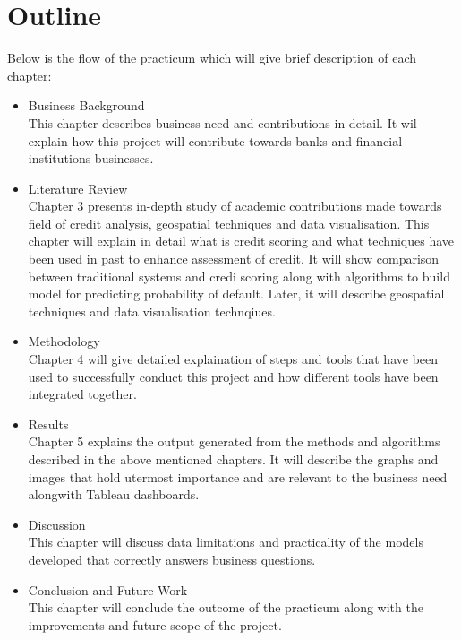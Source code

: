 \section{Outline}
Below is the flow of the practicum which will give brief description of each chapter:
\begin{itemize}
\item Business Background \\ This chapter describes business need and contributions in detail. It wil explain how this project will contribute towards banks and financial institutions businesses. 
\item Literature Review \\ Chapter 3 presents in-depth study of academic contributions made towards field of credit analysis, geospatial techniques and data visualisation. This chapter will explain in detail what is credit scoring and what techniques have been used in past to enhance assessment of credit. It will show comparison between traditional systems and credi scoring along with algorithms to build model for predicting probability of default. Later, it will describe geospatial techniques and data visualisation technqiues.
\item Methodology \\ Chapter 4 will give detailed explaination of steps and tools that have been used to successfully conduct this project and how different tools have been integrated together.
\item Results \\ Chapter 5 explains the output generated from the methods and algorithms described in the above mentioned chapters. It will describe the graphs and images that hold utermost importance and are relevant to the business need alongwith Tableau dashboards.
\item Discussion \\ This chapter will discuss data limitations and practicality of the models developed that correctly answers business questions. 
\item Conclusion and Future Work \\ This chapter will conclude the outcome of the practicum along with the improvements and future scope of the project.
\end{itemize}
